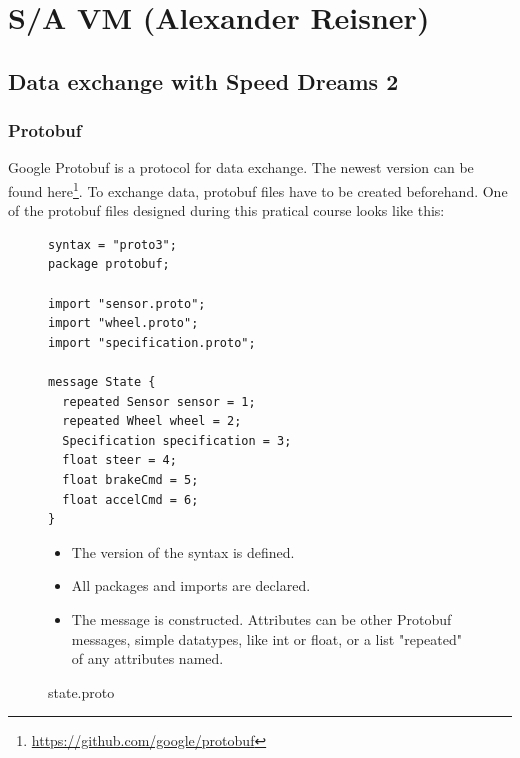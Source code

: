 \documentclass[paper=a4, fontsize=11pt]{scrreprt}
\begin{document}
\chapter{S/A VM (Alexander Reisner)}
\section{Data exchange with Speed Dreams 2}
  \subsection{Protobuf}\label{ar_protobuf_subsection}
Google Protobuf is a protocol for data exchange.
The newest version can be found here\footnote{\url{https://github.com/google/protobuf}}.
To exchange data, protobuf files have to be created beforehand.
One of the protobuf files designed during this pratical course looks like this:
\begin{figure}[!h]
\begin{minipage}{0.5\textwidth}
\centering
  \begin{verbatim}
syntax = "proto3";
package protobuf;

import "sensor.proto";
import "wheel.proto";
import "specification.proto";

message State {
  repeated Sensor sensor = 1;
  repeated Wheel wheel = 2;
  Specification specification = 3;
  float steer = 4;
  float brakeCmd = 5;
  float accelCmd = 6;
}
  \end{verbatim}
\end{minipage}
  \begin{minipage}{0.5\textwidth}
    \begin{itemize}
\item The version of the syntax is defined.
\item All packages and imports are declared.
\item The message is constructed. Attributes can be other Protobuf messages, simple datatypes, like int or float, or a list "repeated" of any attributes named.
    \end{itemize}
  \end{minipage}
    \caption{state.proto}
  \end{figure}
\end{document}
